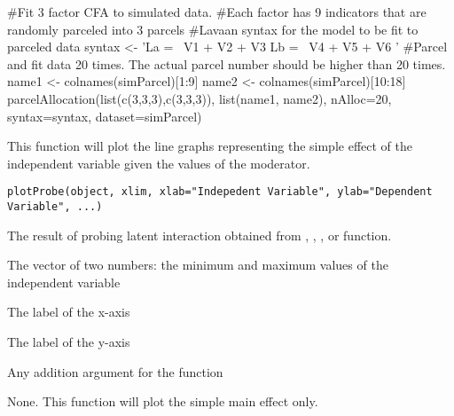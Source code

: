 \documentclass[a4paper]{book}
\begin{document}
%
\begin{Examples}
\begin{ExampleCode}
#Fit 3 factor CFA to simulated data.
#Each factor has 9 indicators that are randomly parceled into 3 parcels
#Lavaan syntax for the model to be fit to parceled data
syntax <- 'La =~ V1 + V2 + V3 
           Lb =~ V4 + V5 + V6
'
#Parcel and fit data 20 times. The actual parcel number should be higher than 20 times.
name1 <- colnames(simParcel)[1:9]
name2 <- colnames(simParcel)[10:18]
parcelAllocation(list(c(3,3,3),c(3,3,3)), list(name1, name2), nAlloc=20, syntax=syntax, 
	dataset=simParcel)
\end{ExampleCode}
\end{Examples}
%
\begin{Description}\relax
This function will plot the line graphs representing the simple effect of the independent variable given the values of the moderator.
\end{Description}
%
\begin{Usage}
\begin{verbatim}
plotProbe(object, xlim, xlab="Indepedent Variable", ylab="Dependent Variable", ...)
\end{verbatim}
\end{Usage}
%
\begin{Arguments}
\begin{ldescription}
\item[\code{object}] 
The result of probing latent interaction obtained from , , , or  function.

\item[\code{xlim}] 
The vector of two numbers: the minimum and maximum values of the independent variable

\item[\code{xlab}] 
The label of the x-axis

\item[\code{ylab}] 
The label of the y-axis

\item[\code{...}] 
Any addition argument for the  function

\end{ldescription}
\end{Arguments}
%
\begin{Value}
None. This function will plot the simple main effect only.
\end{Value}
\end{document}
